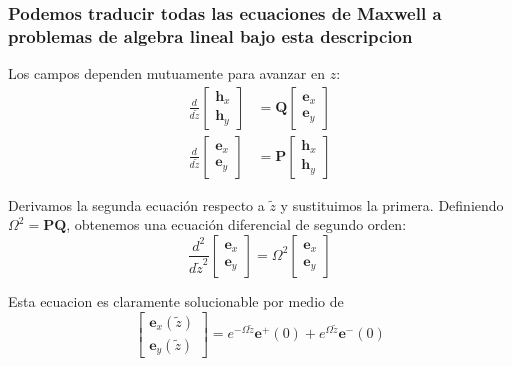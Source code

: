 \documentclass[english,9pt]{Linnaeus}
\begin{document}
\begin{frame}[allowframebreaks]
  \frametitle{Podemos traducir todas las ecuaciones de Maxwell a problemas de algebra lineal bajo esta descripcion}
  Los campos dependen mutuamente para avanzar en $z$:
  \begin{align*}
    \frac{d}{d\tilde{z}} \begin{bmatrix} \mathbf{h}_x \\ \mathbf{h}_y \end{bmatrix} &= \mathbf{Q} \begin{bmatrix} \mathbf{e}_x \\ \mathbf{e}_y \end{bmatrix} \\
      \frac{d}{d\tilde{z}} \begin{bmatrix} \mathbf{e}_x \\ \mathbf{e}_y \end{bmatrix} &= \mathbf{P} \begin{bmatrix} \mathbf{h}_x \\ \mathbf{h}_y \end{bmatrix}
  \end{align*}

  \framebreak
  Derivamos la segunda ecuación respecto a $\tilde{z}$ y sustituimos la primera. Definiendo $\mathbf{\varOmega}^2 = \mathbf{PQ}$, obtenemos una ecuación diferencial de segundo orden:
  \begin{equation*}
    \frac{d^2}{d\tilde{z}^2} \begin{bmatrix} \mathbf{e}_x \\ \mathbf{e}_y \end{bmatrix} = \mathbf{\varOmega}^2 \begin{bmatrix} \mathbf{e}_x \\ \mathbf{e}_y \end{bmatrix}
  \end{equation*}

  \framebreak
  Esta ecuacion es claramente solucionable por medio de 
  \begin{equation*}
    \begin{bmatrix} \mathbf{e}_x(\tilde{z}) \\ \mathbf{e}_y(\tilde{z}) \end{bmatrix} = e^{-\mathbf{\varOmega}\tilde{z}} \mathbf{e}^+(0) + e^{\mathbf{\varOmega}\tilde{z}} \mathbf{e}^-(0)
  \end{equation*}
\end{frame}
\end{document}
